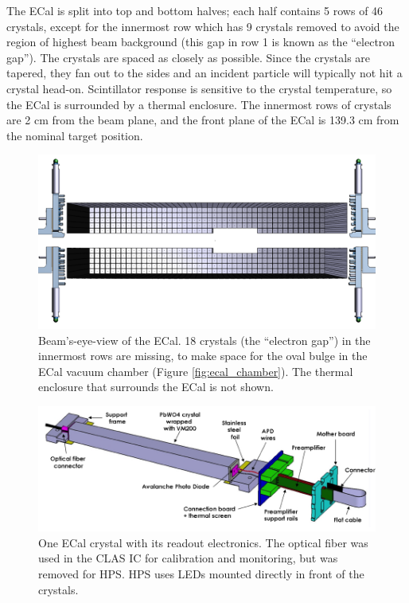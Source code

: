 The ECal is split into top and bottom halves; each half contains 5 rows of 46 crystals, except for the innermost row which has 9 crystals removed to avoid the region of highest beam background (this gap in row 1 is known as the ``electron gap'').
The crystals are spaced as closely as possible.
Since the crystals are tapered, they fan out to the sides and an incident particle will typically not hit a crystal head-on.
Scintillator response is sensitive to the crystal temperature, so the ECal is surrounded by a thermal enclosure.
The innermost rows of crystals are 2 cm from the beam plane, and the front plane of the ECal is 139.3 cm from the nominal target position.

\begin{figure}[htp]
    \includegraphics[width=\textwidth]{detector/figs/ECal}
    \caption{Beam's-eye-view of the ECal.
    18 crystals (the ``electron gap'') in the innermost rows are missing, to make space for the oval bulge in the ECal vacuum chamber (Figure \ref{fig:ecal_chamber}).
    The thermal enclosure that surrounds the ECal is not shown.}
    \label{fig:ecal}
\end{figure}

\begin{figure}[htp]
    \includegraphics[width=\textwidth]{detector/figs/ecal_module}
    \caption{One ECal crystal with its readout electronics. The optical fiber was used in the CLAS IC for calibration and monitoring, but was removed for HPS. HPS uses LEDs mounted directly in front of the crystals.}
    \label{fig:ecal_module}
\end{figure}

